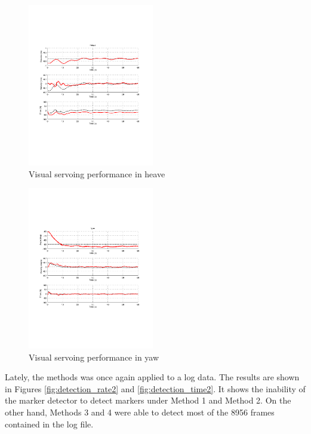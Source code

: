 \documentclass[conference, letterpaper]{IEEEtran}
\begin{document}
\begin{figure}[!ht]
	\centering
    \includegraphics[width=0.49\textwidth, trim={1.6cm 6.9cm 2.3cm 6.7cm}]{./fig/vs_heave.pdf}
    \caption{Visual servoing performance in heave}
	\label{fig:vs_heave}
\end{figure}

\begin{figure}[!ht]
	\centering
    \includegraphics[width=0.49\textwidth, trim={1.6cm 6.9cm 2.3cm 6.7cm}]{./fig/vs_yaw.pdf}
    \caption{Visual servoing performance in yaw}
	\label{fig:vs_yaw}
\end{figure}

Lately, the methods was once again applied to a log data. The results are shown
in Figures \ref{fig:detection_rate2} and \ref{fig:detection_time2}. It shows
the inability of the marker detector to detect markers under Method 1 and
Method 2. On the other hand, Methods 3 and 4 were able to detect most of the
8956 frames contained in the log file. 
\end{document}
